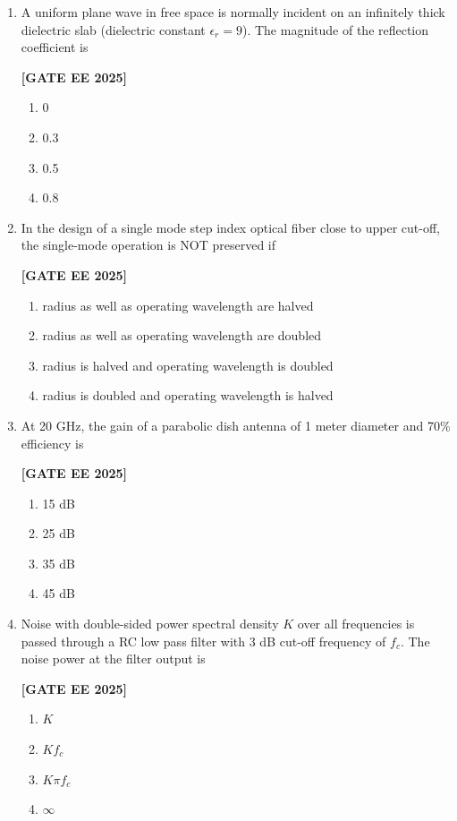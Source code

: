 \documentclass[12pt]{article}
\begin{document}
\begin{enumerate}[leftmargin=*, label=\textbf{Q.\arabic*:}]
\item A uniform plane wave in free space is normally incident on an infinitely thick dielectric slab (dielectric constant $\epsilon_r = 9$). The magnitude of the reflection coefficient is
 
\noindent \textbf{[GATE EE 2025]}
\begin{enumerate}[label=(\Alph*)]
  \item 0
  \item 0.3
  \item 0.5
  \item 0.8
\end{enumerate}

\item In the design of a single mode step index optical fiber close to upper cut-off, the single-mode operation is NOT preserved if
 
\noindent \textbf{[GATE EE 2025]}
\begin{enumerate}[label=(\Alph*)]
  \item radius as well as operating wavelength are halved
  \item radius as well as operating wavelength are doubled
  \item radius is halved and operating wavelength is doubled
  \item radius is doubled and operating wavelength is halved
\end{enumerate}

\item At 20 GHz, the gain of a parabolic dish antenna of 1 meter diameter and 70\% efficiency is
 
\noindent \textbf{[GATE EE 2025]}
\begin{enumerate}[label=(\Alph*)]
  \item 15 dB
  \item 25 dB
  \item 35 dB
  \item 45 dB
\end{enumerate}

\item Noise with double-sided power spectral density $K$ over all frequencies is passed through a RC low pass filter with 3 dB cut-off frequency of $f_c$. The noise power at the filter output is
 
\noindent \textbf{[GATE EE 2025]}
\begin{enumerate}[label=(\Alph*)]
  \item $K$
  \item $K f_c$
  \item $K \pi f_c$
  \item $\infty$
\end{enumerate}


\end{enumerate}
\end{document}
